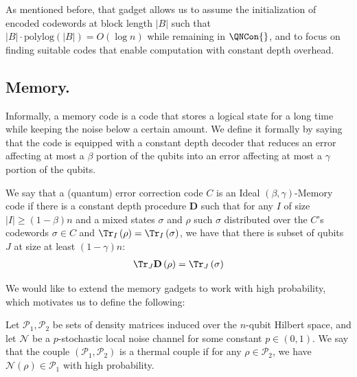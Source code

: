 As mentioned before, that gadget allows us to assume the initialization of encoded codewords at block length $|B|$ such that $|B| \cdot \text{polylog}(|B|) = O(\log n)$ while remaining in $\QNCon{}$, and to focus on finding suitable codes that enable computation with constant depth overhead.


 \subsection{Memory.} 
 \newcommand*{\DD}{\mathbf{D} }
Informally, a memory code is a code that stores a logical state for a long time while keeping the noise below a certain amount. We define it formally by saying that the code is equipped with a constant depth decoder that reduces an error affecting at most a $\beta$ portion of the qubits into an error affecting at most a $\gamma$ portion of the qubits.

 \begin{definition}
   We say that a (quantum) error correction code $C$ is an Ideal $(\beta,\gamma)$-Memory code if there is a constant depth procedure $\DD$ such that for any $I$ of size $|I| \ge (1 - \beta) n$ and a mixed states $\sigma$ and $\rho$ such $\sigma$ distributed over the $C$'s codewords $\sigma \in C$ and $\Tr_{I}\left(\rho\right) = \Tr_{I}\left(\sigma\right)$, we have that there is subset of qubits $J$ at size at least $(1-\gamma)n$:
   \begin{equation*}
     \begin{split}
        \Tr_{J} \DD \left(\rho\right) = \Tr_{J}\left(\sigma\right) 
     \end{split}
   \end{equation*}

 \end{definition}
We would like to extend the memory gadgets to work with high probability, which motivates us to define the following:
\newcommand*{\Po}{\mathcal{P}_{1}}
\newcommand*{\Pt}{\mathcal{P}_{2}}
\newcommand*{\Nn}{\mathcal{N}}
\begin{definition}[ $\left(\Po,\Pt \right)$- thermal couple. ]
Let $\Po,\Pt$ be sets of density matrices induced over the $n$-qubit Hilbert space, and let $\Nn$ be a $p$-stochastic local noise channel for some constant $p \in (0,1)$. We say that the couple $\left(\Po,\Pt \right)$ is a thermal couple if for any $\rho \in \Pt$, we have $\Nn(\rho) \in \Po$ with high probability.
\end{definition}

